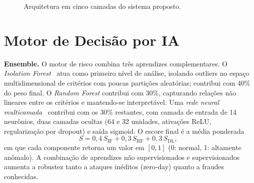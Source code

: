 \documentclass[conference]{IEEEtran}
\begin{document}
\begin{figure}[t]
\centering
{}
\caption{Arquitetura em cinco camadas do sistema proposto.}
\label{fig:arch}
\end{figure}

\section{Motor de Decisão por IA}
\label{sec:ai}
\textbf{Ensemble.} O motor de risco combina três aprendizes
complementares. O \emph{Isolation Forest}~\cite{liu2008} atua como
primeiro nível de análise, isolando outliers no espaço multidimensional
de critérios com poucas partições aleatórias; contribui com 40\% do peso
final. O \emph{Random Forest} contribui com 30\%, capturando relações não
lineares entre os critérios e mantendo-se interpretável. Uma \emph{rede
neural multicamada}~\cite{goodfellow2016} contribui com os 30\%
restantes, com camada de entrada de 14 neurônios, duas camadas ocultas
(64 e 32 unidades, ativações ReLU, regularização por dropout) e saída
sigmoid. O escore final é a média ponderada
\begin{equation}
S = 0{,}4\,S_{\mathrm{IF}} + 0{,}3\,S_{\mathrm{RF}} + 0{,}3\,S_{\mathrm{DL}},
\label{eq:ensemble}
\end{equation}
em que cada componente retorna um valor em $[0,1]$ (0: normal, 1:
altamente anômalo). A combinação de aprendizes não supervisionados e
supervisionados aumenta a robustez tanto a ataques inéditos (zero-day)
quanto a fraudes conhecidas.
\end{document}
